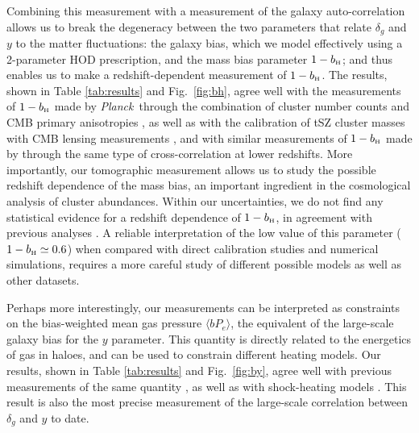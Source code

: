 \documentclass[useAMS,usenatbib]{mn2e}
\def\bH{b_{\scriptscriptstyle\rm H}}
\def\planck{{\it Planck\/}}
\begin{document}
  Combining this measurement with a measurement of the galaxy auto-correlation allows us to break the degeneracy between the two parameters that relate $\delta_g$ and $y$ to the matter fluctuations: the galaxy bias, which we model effectively using a 2-parameter HOD prescription, and the mass bias parameter $1-\bH$; and thus enables us to make a redshift-dependent measurement of $1-\bH$. The results, shown in Table \ref{tab:results} and Fig.\!~\ref{fig:bh}, agree well with the measurements of $1-\bH$ made by \planck\ through the combination of cluster number counts and CMB primary anisotropies \citep{2016A&A...594A..24P}, as well as with the calibration of tSZ cluster masses with CMB lensing measurements \citep{2019MNRAS.489..401Z}, and with similar measurements of $1-\bH$ made by \cite{2018MNRAS.480.3928M} through the same type of cross-correlation at lower redshifts. More importantly, our tomographic measurement allows us to study the possible redshift dependence of the mass bias, an important ingredient in the cosmological analysis of cluster abundances. Within our uncertainties, we do not find any statistical evidence for a redshift dependence of $1-\bH$, in agreement with previous analyses \citep{2019A&A...626A..27S}. A reliable interpretation of the low value of this parameter ($1-\bH\simeq0.6$) when compared with direct calibration studies and numerical simulations, requires a more careful study of different possible models as well as other datasets.
  
  Perhaps more interestingly, our measurements can be interpreted as constraints on the bias-weighted mean gas pressure $\langle bP_e\rangle$, the equivalent of the large-scale galaxy bias for the $y$ parameter. This quantity is directly related to the energetics of gas in haloes, and can be used to constrain different heating models. Our results, shown in Table \ref{tab:results} and Fig.\!~\ref{fig:by}, agree well with previous measurements of the same quantity \citep{2017MNRAS.467.2315V,2019arXiv190413347P}, as well as with shock-heating models \citep{2012ApJ...758...75B}. This result is also the most precise measurement of the large-scale correlation between $\delta_g$ and $y$ to date.
\end{document}
